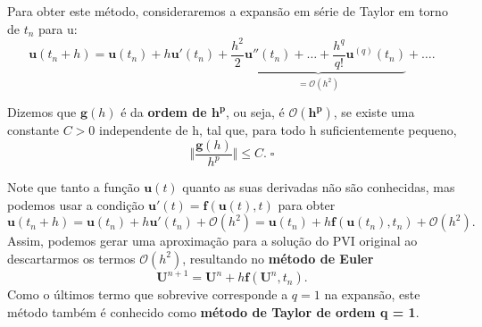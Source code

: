 \documentclass[../differential_methods.tex]{subfiles}
\begin{document}
Para obter este método, consideraremos a expansão em série de Taylor em torno de \(t_{n}\) para u:
\[
	\mathbf{u}(t_{n}+h) = \mathbf{u}(t_{n}) + h \mathbf{u}'(t_{n}) + \underbrace{\frac{h^{2}}{2}\mathbf{u}''(t_{n})+\dotsc +\frac{h^{q}}{q!}\mathbf{u}^{(q)}(t_{n})}_{= \mathcal{O}(h^{2})}+\dotsc .
\]

\begin{def*}
	Dizemos que \(\mathbf{g}(h)\) é da \textbf{ordem de \(\mathbf{h^{p}}\)}, ou seja, é \(\mathbf{\mathcal{O}(h^{p})}\), se existe uma constante \(C> 0\) independente de h, tal que, para todo h suficientemente pequeno,
	\[
		\biggl\Vert \frac{\mathbf{g}(h)}{h^{p}} \biggr\Vert \leq C. \; \square
	\]
\end{def*}
Note que tanto a função \(\mathbf{u}(t)\) quanto as suas derivadas não são conhecidas, mas podemos usar a condição \(\mathbf{u}'(t) = \mathbf{f}(\mathbf{u}(t), t)\) para obter
\[
	\mathbf{u}(t_{n}+h) = \mathbf{u}(t_{n}) + h \mathbf{u}'(t_{n}) + \mathcal{O}(h^{2}) = \mathbf{u}(t_{n}) + h \mathbf{f}(\mathbf{u}(t_{n}), t_{n}) + \mathcal{O}(h^{2}).
\]
Assim, podemos gerar uma aproximação para a solução do PVI original ao descartarmos os termos \(\mathcal{O}(h^{2})\), resultando no \textbf{método de Euler}
\[
	\boxed{\mathbf{U}^{n+1} = \mathbf{U}^{n} + h \mathbf{f}(\mathbf{U}^{n}, t_{n})}.
\]
Como o últimos termo que sobrevive corresponde a \(q=1\) na expansão, este método também é conhecido como \textbf{método de Taylor de ordem q = 1}.
\end{document}
